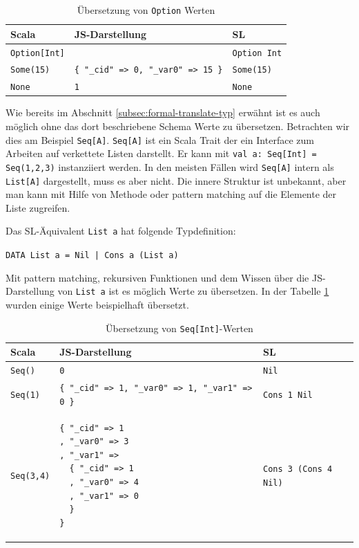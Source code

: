 \documentclass[12pt,bibtotoc]{scrreprt}
\begin{document}
\begin{table}[h]
\caption{Übersetzung von \lstinline!Option! Werten}
\centering
\begin{tabular}{lll}
Scala                   & JS-Darstellung                        & SL \\
\midrule
\lstinline!Option[Int]! &                                            & \lstinline!Option Int! \\
\lstinline!Some(15)!    & \lstinline!{ "_cid" => 0, "_var0" => 15 }! & \lstinline!Some(15)! \\
\lstinline!None!        & \lstinline!1!                              & \lstinline!None! \\
\end{tabular}
\end{table}

Wie bereits im Abschnitt \ref{subsec:formal-translate-typ} erwähnt ist es auch möglich ohne das dort beschriebene Schema Werte zu übersetzen. Betrachten wir dies am Beispiel \lstinline!Seq[A]!. \lstinline!Seq[A]! ist ein Scala Trait der ein Interface zum Arbeiten auf verkettete Listen darstellt. Er kann mit \lstinline!val a: Seq[Int] = Seq(1,2,3)! in­s­tan­zi­ie­rt werden. In den meisten Fällen wird \lstinline!Seq[A]! intern als \lstinline!List[A]! dargestellt, muss es aber nicht. Die innere Struktur ist unbekannt, aber man kann mit Hilfe von Methode oder pattern matching auf die Elemente der Liste zugreifen. 

Das SL-Äquivalent \lstinline!List a! hat folgende Typdefinition:

\begin{center}
\lstinline!DATA List a = Nil | Cons a (List a)!
\end{center}

Mit pattern matching, rekursiven Funktionen und dem Wissen über die JS-Darstellung von \lstinline!List a! ist es möglich Werte zu übersetzen. In der Tabelle \ref{tab:seq-int} wurden einige Werte beispielhaft übersetzt.

\lstset{basicstyle=\ttfamily\small, numbers=none}
\begin{table}[h]
\caption{Übersetzung von \lstinline!Seq[Int]!-Werten}
\centering
\begin{tabular}{lll}
Scala                & JS-Darstellung                        & SL \\
\midrule
\lstinline!Seq()!    & \lstinline!0! & \lstinline!Nil! \\
\lstinline!Seq(1)!   & \lstinline!{ "_cid" => 1, "_var0" => 1, "_var1" => 0 }!                              & \lstinline!Cons 1 Nil! \\
\lstinline!Seq(3,4)! & 
\begin{lstlisting}
{ "_cid" => 1
, "_var0" => 3
, "_var1" => 
  { "_cid" => 1
  , "_var0" => 4
  , "_var1" => 0
  }
}
\end{lstlisting} & \lstinline!Cons 3 (Cons 4 Nil)! \\
\end{tabular}
\label{tab:seq-int}
\end{table}
\lstset{basicstyle=\ttfamily\small, numbers=left, numberstyle=\tiny}
\end{document}
